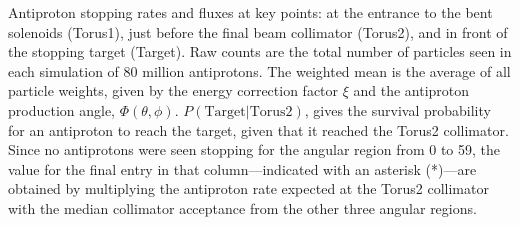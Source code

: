 {\begin{table}[p]
{Antiproton stopping rates and fluxes at key points: at the entrance to the bent
solenoids (Torus1), just before the final beam collimator (Torus2), and in front of the
stopping target (Target).
Raw counts are the total number of particles seen in each simulation of 80
million antiprotons. The weighted mean is the average of all particle
weights, given by the energy correction factor $\xi$
and the antiproton production angle, $\Phi(\theta,\phi)$.
$P(\textrm{Target}|\textrm{Torus2})$, gives the survival
probability for an antiproton to reach the target, given that it reached the Torus2 collimator.
Since no antiprotons were seen stopping for the angular region from 0 to
59\degree, the value for the final entry in that column---indicated
with an asterisk (*)---are obtained by multiplying the antiproton rate
expected at the Torus2 collimator with the median collimator acceptance from
the other three angular regions.%
}
\end{table}\xspace}


